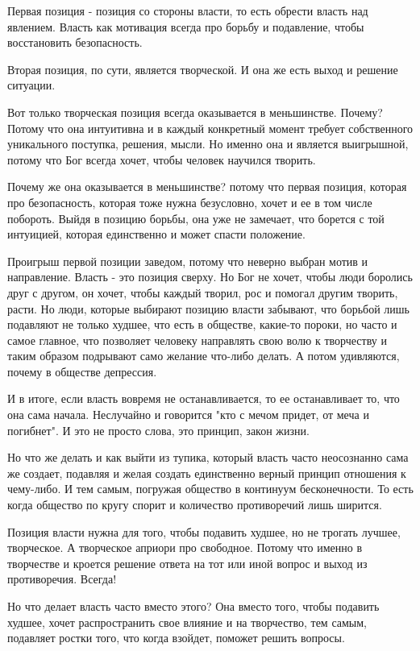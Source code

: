 Первая позиция - позиция со стороны власти, то есть обрести власть над
явлением. Власть как мотивация всегда про борьбу и подавление, чтобы
восстановить безопасность. 

Вторая позиция, по сути, является творческой. И она же есть выход и решение
ситуации. 

Вот только творческая позиция всегда оказывается в меньшинстве. Почему? Потому
что она интуитивна и в каждый конкретный момент требует собственного
уникального поступка, решения, мысли. Но именно она и является выигрышной,
потому что Бог всегда хочет, чтобы человек научился творить. 

Почему же она оказывается в меньшинстве? потому что первая позиция, которая про
безопасность, которая тоже нужна безусловно, хочет и ее в том числе побороть.
Выйдя в позицию борьбы, она уже не замечает, что борется с той интуицией,
которая единственно и может спасти положение. 

Проигрыш первой позиции заведом, потому что неверно выбран мотив и направление.
Власть - это позиция сверху. Но Бог не хочет, чтобы люди боролись друг с
другом, он хочет, чтобы каждый творил, рос и помогал другим творить, расти. Но
люди, которые выбирают позицию власти забывают, что борьбой лишь подавляют не
только худшее, что есть в обществе, какие-то пороки, но часто и самое главное,
что позволяет человеку направлять свою волю к творчеству и таким образом
подрывают само желание что-либо делать. А потом удивляются, почему в обществе
депрессия. 

И в итоге, если власть вовремя не останавливается, то ее останавливает то, что
она сама начала. Неслучайно и говорится "кто с мечом придет, от меча и
погибнет". И это не просто слова, это принцип, закон жизни. 

Но что же делать и как выйти из тупика, который власть часто неосознанно сама
же создает, подавляя и желая создать единственно верный принцип отношения к
чему-либо. И тем самым, погружая общество в континуум бесконечности. То есть
когда общество по кругу спорит и количество противоречий лишь ширится. 

Позиция власти нужна для того, чтобы подавить худшее, но не трогать лучшее,
творческое. А творческое априори про свободное. Потому что именно в творчестве
и кроется решение ответа на тот или иной вопрос и выход из противоречия.
Всегда! 

Но что делает власть часто вместо этого? Она вместо того, чтобы подавить
худшее, хочет распространить свое влияние и на творчество, тем самым, подавляет
ростки того, что когда взойдет, поможет решить вопросы. 

